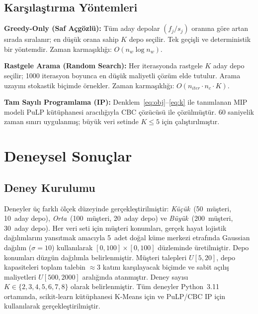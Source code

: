 \documentclass[conference]{IEEEtran}
\begin{document}
\subsection{Kar\c{s}{\i}la\c{s}t{\i}rma Y\"{o}ntemleri}

\textbf{Greedy-Only (Saf A\c{c}g\"{o}zl\"{u}):}
T\"{u}m aday depolar $(f_j/s_j)$ oran{\i}na g\"{o}re artan s{\i}rada
s{\i}ralan{\i}r; en d\"{u}\c{s}\"{u}k orana sahip $K$ depo se\c{c}ilir.
Tek ge\c{c}i\c{s}li ve deterministik bir y\"{o}ntemdir.
Zaman karma\c{s}{\i}kl{\i}\u{g}{\i}: $O(n_w \log n_w)$.

\textbf{Rastgele Arama (Random Search):}
Her iterasyonda rastgele $K$ aday depo se\c{c}ilir;
1000 iterasyon boyunca en d\"{u}\c{s}\"{u}k maliyetli \c{c}\"{o}z\"{u}m
elde tutulur.
Arama uzay{\i}n{\i} stokastik bi\c{c}imde \"{o}rnekler.
Zaman karma\c{s}{\i}kl{\i}\u{g}{\i}: $O(n_{iter} \cdot n_c \cdot K)$.

\textbf{Tam Say{\i}l{\i} Programlama (IP):}
Denklem~\eqref{eq:obj}--\eqref{eq:k} ile tan{\i}mlanan MIP modeli
PuLP k\"{u}t\"{u}phanesi arac{\i}l{\i}\u{g}{\i}yla CBC \c{c}\"{o}z\"{u}c\"{u}s\"{u}
ile \c{c}\"{o}z\"{u}lm\"{u}\c{s}t\"{u}r.
60 saniyelik zaman s{\i}n{\i}r{\i} uygulanm{\i}\c{s};
b\"{u}y\"{u}k veri setinde $K \leq 5$ i\c{c}in \c{c}al{\i}\c{s}t{\i}r{\i}lm{\i}\c{s}t{\i}r.

\section{Deneysel Sonu\c{c}lar}
\label{sec:exp}

\subsection{Deney Kurulumu}

Deneyler \"{u}\c{c} farkl{\i} \"{o}l\c{c}ek d\"{u}zeyinde
ger\c{c}ekle\c{s}tirilmi\c{s}tir:
\textit{K\"{u}\c{c}\"{u}k}~(50~m\"{u}\c{s}teri, 10~aday depo),
\textit{Orta}~(100~m\"{u}\c{s}teri, 20~aday depo) ve
\textit{B\"{u}y\"{u}k}~(200~m\"{u}\c{s}teri, 30~aday depo).
Her veri seti i\c{c}in m\"{u}\c{s}teri konumlar{\i}, ger\c{c}ek hayat
lojistik da\u{g}{\i}l{\i}mlar{\i}n{\i} yans{\i}tmak amac{\i}yla
5~adet do\u{g}al k\"{u}me merkezi etraf{\i}nda Gaussian da\u{g}{\i}l{\i}m
($\sigma{=}10$) kullan{\i}larak $[0,100]{\times}[0,100]$ d\"{u}zleminde
\"{u}retilmi\c{s}tir.
Depo konumlar{\i} d\"{u}zg\"{u}n da\u{g}{\i}l{\i}mla belirlenmi\c{s}tir.
M\"{u}\c{s}teri talepleri $U[5,20]$, depo kapasiteleri toplam talebin
$\approx$3 kat{\i}n{\i} kar\c{s}{\i}layacak bi\c{c}imde ve sabit a\c{c}{\i}l{\i}\c{s}
maliyetleri $U[500,2000]$ aral{\i}\u{g}{\i}nda atanm{\i}\c{s}t{\i}r.
Deney say{\i}s{\i} $K \in \{2,3,4,5,6,7,8\}$ olarak belirlenmi\c{s}tir.
T\"{u}m deneyler Python~3.11 ortam{\i}nda, scikit-learn k\"{u}t\"{u}phanesi
K-Means i\c{c}in ve PuLP/CBC IP i\c{c}in kullan{\i}larak
ger\c{c}ekle\c{s}tirilmi\c{s}tir.
\end{document}
